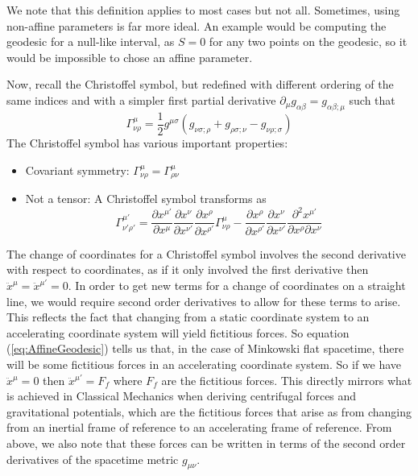 \documentclass{article}
\begin{document}
 		\pagebreak
 			We note that this definition applies to most cases but not all. Sometimes, using non-affine parameters is far more ideal. An example would be computing the geodesic for a null-like interval, as $S=0$ for any two points on the geodesic, so it would be impossible to chose an affine parameter.
 			
 			Now, recall the Christoffel symbol, but redefined with different ordering of the same indices and with a simpler first partial derivative $\partial_\mu g_{\alpha\beta} = g_{\alpha\beta; \mu}$ such that
 			$$ \Gamma^\mu_{\nu\rho} = \frac12 g^{\mu\sigma} \left( g_{\nu\sigma;\rho} + g_{\rho\sigma;\nu} - g_{\nu\rho;\sigma} \right)$$
 			The Christoffel symbol has various important properties:
 			\begin{itemize}
 				\item Covariant symmetry: $\Gamma_{\nu\rho}^\mu = \Gamma_{\rho\nu}^\mu$
 				\item Not a tensor:
 				\subitem A Christoffel symbol transforms as
 				\begin{equation}
 					\label{eq:ChristoffelTransformation}
 					\boxed{
 						\Gamma_{\nu' \rho'}^{\mu'} = \frac{\partial x^{\mu'}}{\partial x^{\mu}}\frac{\partial x^{\nu}}{\partial x^{\nu'}}\frac{\partial x^{\rho}}{\partial x^{\rho'}} \Gamma_{\nu \rho}^{\mu} - \frac{\partial x^{\rho}}{\partial x^{\rho'}}\frac{\partial x^{\nu}}{\partial x^{\nu'}}\frac{\partial^2 x^{\mu'}}{\partial x^{\rho}\partial x^{\nu}}
 					}
 				\end{equation}
 			\end{itemize}
 		
 			The change of coordinates for a Christoffel symbol involves the second derivative with respect to coordinates, as if it only involved the first derivative then $\ddot{x}^\mu = \ddot{x}^{\mu'} = 0$. In order to get new terms for a change of coordinates on a straight line, we would require second order derivatives to allow for these terms to arise. This reflects the fact that changing from a static coordinate system to an accelerating coordinate system will yield fictitious forces. So equation (\ref{eq:AffineGeodesic}) tells us that, in the case of Minkowski flat spacetime, there will be some fictitious forces in an accelerating coordinate system. So if we have $\ddot{x}^\mu = 0$ then $\ddot{x}^{\mu'} = F_{f}$ where $F_{f}$ are the fictitious forces. This directly mirrors what is achieved in Classical Mechanics when deriving centrifugal forces and gravitational potentials, which are the fictitious forces that arise as from changing from an inertial frame of reference to an accelerating frame of reference. From above, we also note that these forces can be written in terms of the second order derivatives of the spacetime metric $g_{\mu\nu}$.
 			
\end{document}
